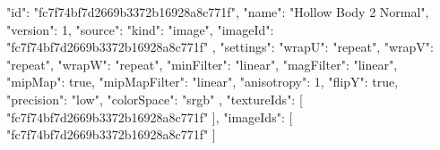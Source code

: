 {
  "id": "fc7f74bf7d2669b3372b16928a8c771f",
  "name": "Hollow Body 2 Normal",
  "version": 1,
  "source": {
    "kind": "image",
    "imageId": "fc7f74bf7d2669b3372b16928a8c771f"
  },
  "settings": {
    "wrapU": "repeat",
    "wrapV": "repeat",
    "wrapW": "repeat",
    "minFilter": "linear",
    "magFilter": "linear",
    "mipMap": true,
    "mipMapFilter": "linear",
    "anisotropy": 1,
    "flipY": true,
    "precision": "low",
    "colorSpace": "srgb"
  },
  "textureIds": [
    "fc7f74bf7d2669b3372b16928a8c771f"
  ],
  "imageIds": [
    "fc7f74bf7d2669b3372b16928a8c771f"
  ]
}
